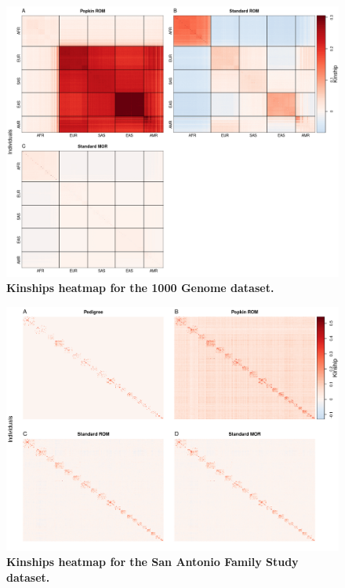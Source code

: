 \documentclass[11pt]{article}
\begin{document}
\begin{figure}[bp!]
  \centering
  \includegraphics[width=\textwidth]{data/SFig_TGP_kinships.png}
  \caption{
    {\bf Kinships heatmap for the 1000 Genome dataset.}
    }
  \label{fig:TGP_kinships}
\end{figure}

\begin{figure}[bp!]
  \centering
  \includegraphics[width=\textwidth]{data/SFig_T2D_kinships.png}
  \caption{
    {\bf Kinships heatmap for the San Antonio Family
Study dataset.}
    }
  \label{fig:T2D_kinships}
\end{figure}
\end{document}
